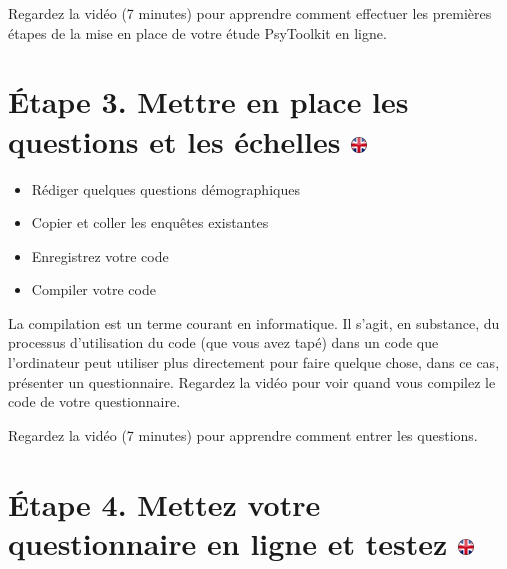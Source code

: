 \documentclass[
]{book}
\providecommand{\tightlist}{%
  \setlength{\itemsep}{0pt}\setlength{\parskip}{0pt}}
\begin{document}
Regardez la vidéo (7 minutes) pour apprendre comment effectuer les premières étapes de la mise en place de votre étude PsyToolkit en ligne.

\hypertarget{uxe9tape-3.-mettre-en-place-les-questions-et-les-uxe9chelles}{%
\section[Étape 3. Mettre en place les questions et les échelles ]{\texorpdfstring{Étape 3. Mettre en place les questions et les échelles \href{https://www.psytoolkit.org/lessons/questionnaire-project.html\#_step_3_setup_questions_and_scales}{\protect\includegraphics{img/ukflag.png}}}{Étape 3. Mettre en place les questions et les échelles }}\label{uxe9tape-3.-mettre-en-place-les-questions-et-les-uxe9chelles}}

\begin{itemize}
\tightlist
\item
  Rédiger quelques questions démographiques
\item
  Copier et coller les enquêtes existantes
\item
  Enregistrez votre code
\item
  Compiler votre code
\end{itemize}

La compilation est un terme courant en informatique. Il s'agit, en substance, du processus d'utilisation du code (que vous avez tapé) dans un code que l'ordinateur peut utiliser plus directement pour faire quelque chose, dans ce cas, présenter un questionnaire. Regardez la vidéo pour voir quand vous compilez le code de votre questionnaire.

Regardez la vidéo (7 minutes) pour apprendre comment entrer les questions.

\hypertarget{uxe9tape-4.-mettez-votre-questionnaire-en-ligne-et-testez}{%
\section[Étape 4. Mettez votre questionnaire en ligne et testez ]{\texorpdfstring{Étape 4. Mettez votre questionnaire en ligne et testez \href{https://www.psytoolkit.org/lessons/questionnaire-project.html\#_step_4_bring_your_scale_online_and_test}{\protect\includegraphics{img/ukflag.png}}}{Étape 4. Mettez votre questionnaire en ligne et testez }}\label{uxe9tape-4.-mettez-votre-questionnaire-en-ligne-et-testez}}
\end{document}
